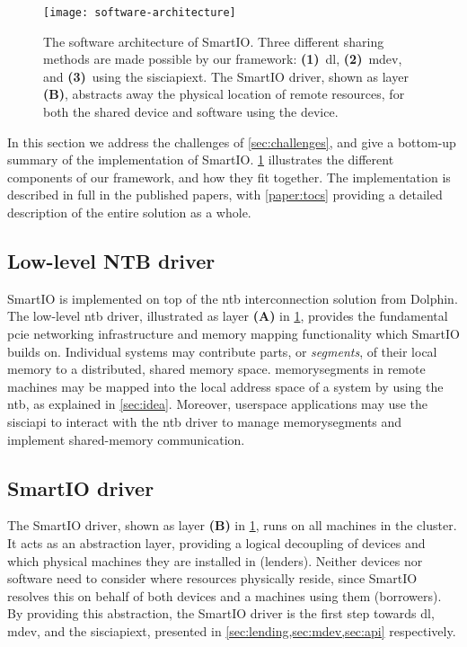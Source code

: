 \begin{figure}
    \centering
    \texttt{[image: software-architecture]}
    \caption[Three different sharing methods are made possible by our framework. The SmartIO driver abstracts away the physical location of a remote resource]
    {The software architecture of SmartIO. Three different sharing methods are made possible by our framework: \textbf{(1)}~\gls{dl}, \textbf{(2)}~\gls{mdev}, and \textbf{(3)}~using the \gls{sisciapiext}. The SmartIO driver, shown as layer \textbf{(B)}, abstracts away the physical location of remote resources, for both the shared device and software using the device.}
    \label{fig:architecture}
\end{figure}


In this section we address the challenges of \cref{sec:challenges}, and give a bottom-up summary of the implementation of SmartIO.
%
\cref{fig:architecture} illustrates the different components of our framework, and how they fit together.
%
The implementation is described in full in the published papers, with \cref{paper:tocs} providing a detailed description of the entire solution as a whole.



\subsection{Low-level NTB driver}\label{sec:ntb-driver}
SmartIO is implemented on top of the \gls{ntb} interconnection solution from Dolphin.
%
The low-level \gls{ntb} driver, illustrated as layer \textbf{(A)} in \cref{fig:architecture}, provides the fundamental \gls{pcie} networking infrastructure and memory mapping functionality which SmartIO builds on.
%
Individual systems may contribute parts, or \emph{\glspl{segment}}, of their local memory to a distributed, shared memory space. 
%
\Glspl{memorysegment} in remote machines may be mapped into the local address space of a system by using the \gls{ntb}, as explained in \cref{sec:idea}.
%
Moreover, \gls{userspace} applications may use the \gls{sisciapi} to interact with the \gls{ntb} driver to manage \glspl{memorysegment} and implement shared-memory communication.



\subsection{SmartIO driver}\label{sec:smartio-driver}
The SmartIO driver, shown as layer \textbf{(B)} in \cref{fig:architecture}, runs on all machines in the cluster.
%
It acts as an abstraction layer, providing a logical decoupling of devices and which physical machines they are installed in (\glspl{lender}).
%
Neither devices nor software need to consider where resources physically reside, since SmartIO resolves this on behalf of both devices and a machines using them (\glspl{borrower}).
%
By providing this abstraction, the SmartIO driver is the first step towards \gls{dl}, \gls{mdev}, and the \gls{sisciapiext}, presented in \cref{sec:lending,sec:mdev,sec:api} respectively.


